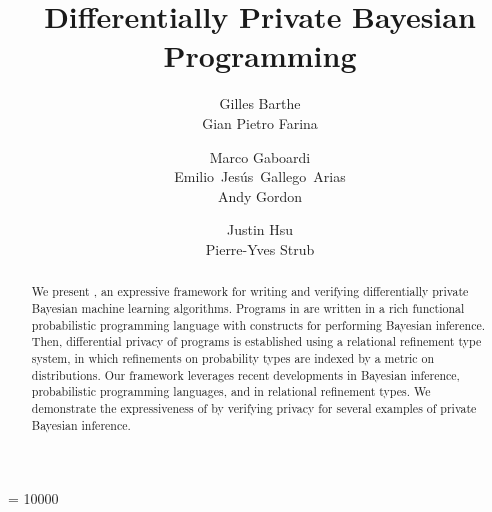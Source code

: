 \documentclass{sig-alternate-05-2015}
\theoremstyle{plain}
\theoremstyle{definition}
\theoremstyle{corollary}
\begin{document}

\widowpenalty = 10000
\title{Differentially Private Bayesian Programming}
\author{
  \alignauthor
  Gilles Barthe \\
  \alignauthor
  Gian Pietro Farina\\
  \and
  \alignauthor
  Marco Gaboardi{\raisebox{12pt}{$\scriptstyle *$}}\\
  \alignauthor
  \mbox{Emilio Jes\'us Gallego Arias}  \\
  \alignauthor
  Andy Gordon\\
  \and
  \alignauthor
  Justin Hsu\\
  \alignauthor
  Pierre-Yves Strub\\
}
\maketitle
\begin{abstract}
  We present \THESYSTEM, an expressive framework for writing and
  verifying differentially private Bayesian machine learning algorithms. Programs
  in \THESYSTEM are written in a rich functional probabilistic programming language
  with constructs for performing Bayesian inference. Then, differential
  privacy of programs is established using a relational refinement type
  system, in which refinements on probability types are indexed by a
  metric on distributions. Our framework leverages recent developments
  in Bayesian inference, probabilistic programming languages, and in
  relational refinement types. We demonstrate the expressiveness
  of \THESYSTEM by verifying privacy for several examples of private
  Bayesian inference.
\end{abstract}
\end{document}
